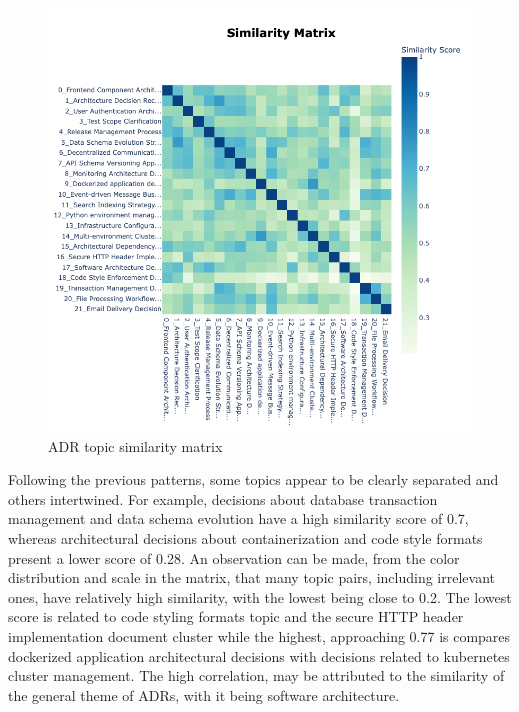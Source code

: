         \begin{figure}[H]
            \centering
            \includegraphics[scale=0.5]{figures/BerTopic_Original/heatmap_original.png}
            \caption{ADR topic similarity matrix}
            \label{fig:similarity_matrix_orginal}
        \end{figure}
        
        Following the previous patterns, some topics appear to be clearly separated and others intertwined. For example, decisions about database transaction management and data schema evolution have a high similarity score of 0.7, whereas architectural decisions about containerization and code style formats present a lower score of 0.28. An observation can be made, from the color distribution and scale in the matrix, that many topic pairs, including irrelevant ones, have relatively high similarity, with the lowest being close to 0.2. The lowest score is related to code styling formats topic and the secure HTTP header implementation document cluster while the highest, approaching 0.77 is compares dockerized application architectural decisions with decisions related to kubernetes cluster management. The high correlation, may be attributed to the similarity of the general theme of ADRs, with it being software architecture.

